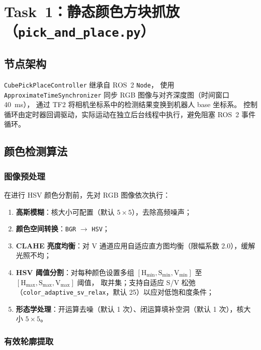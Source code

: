 \documentclass[12pt,a4paper]{article}
\begin{document}
\section{Task~1：静态颜色方块抓放（\texttt{pick\_and\_place.py}）}

\subsection{节点架构}

\texttt{CubePickPlaceController} 继承自 ROS~2 \texttt{Node}，
使用 \texttt{ApproximateTimeSynchronizer} 同步 RGB 图像与对齐深度图（时间窗口 40~ms），
通过 TF2 将相机坐标系中的检测结果变换到机器人 base 坐标系。
控制循环由定时器回调驱动，实际运动在独立后台线程中执行，避免阻塞 ROS~2 事件循环。

\subsection{颜色检测算法}

\subsubsection{图像预处理}

在进行 HSV 颜色分割前，先对 RGB 图像依次执行：
\begin{enumerate}[noitemsep]
  \item \textbf{高斯模糊}：核大小可配置（默认 $5\times5$），去除高频噪声；
  \item \textbf{颜色空间转换}：\texttt{BGR} $\rightarrow$ \texttt{HSV}；
  \item \textbf{CLAHE 亮度均衡}：对 V 通道应用自适应直方图均衡（限幅系数 2.0），缓解光照不均；
  \item \textbf{HSV 阈值分割}：对每种颜色设置多组 $[\mathrm{H_{min}},\mathrm{S_{min}},\mathrm{V_{min}}]$ 至 $[\mathrm{H_{max}},\mathrm{S_{max}},\mathrm{V_{max}}]$ 阈值，
        取并集；支持自适应 S/V 松弛（\texttt{color\_adaptive\_sv\_relax}，默认 25）以应对低饱和度条件；
  \item \textbf{形态学处理}：开运算去噪（默认 1 次）、闭运算填补空洞（默认 1 次），核大小 $5\times5$。
\end{enumerate}

\subsubsection{有效轮廓提取}
\end{document}
